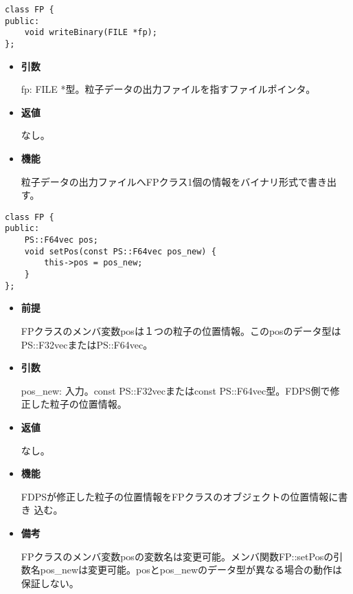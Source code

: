 \label{sec:FP_writeBinary}

\begin{screen}
\begin{verbatim}
class FP {
public:
    void writeBinary(FILE *fp);
};
\end{verbatim}
\end{screen}

\begin{itemize}

\item {\bf 引数}

  fp: FILE *型。粒子データの出力ファイルを指すファイルポインタ。
  
\item {\bf 返値}

  なし。
  
\item {\bf 機能}

  粒子データの出力ファイルへFPクラス1個の情報をバイナリ形式で書き出す。
  
\end{itemize}




\begin{screen}
\begin{verbatim}
class FP {
public:
    PS::F64vec pos;
    void setPos(const PS::F64vec pos_new) {
        this->pos = pos_new;
    }
};
\end{verbatim}
\end{screen}

\begin{itemize}

\item {\bf 前提}

  FPクラスのメンバ変数posは１つの粒子の位置情報。このposのデータ型は
  PS::F32vecまたはPS::F64vec。

\item {\bf 引数}

  pos\_new: 入力。const PS::F32vecまたはconst PS::F64vec型。FDPS側で修
  正した粒子の位置情報。

\item {\bf 返値}

  なし。
  
\item {\bf 機能}

  FDPSが修正した粒子の位置情報をFPクラスのオブジェクトの位置情報に書き
  込む。

\item {\bf 備考}

  FPクラスのメンバ変数posの変数名は変更可能。メンバ関数FP::setPosの引
  数名pos\_newは変更可能。posとpos\_newのデータ型が異なる場合の動作は
  保証しない。

\end{itemize}
\fi


